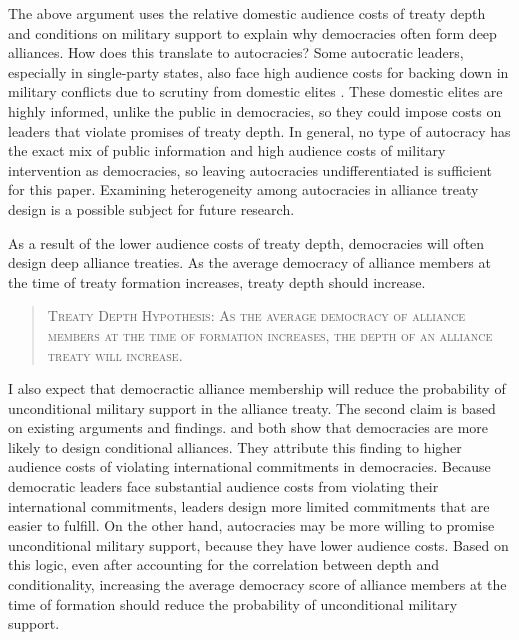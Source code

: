 \documentclass[12pt]{article}
\begin{document}
The above argument uses the relative domestic audience costs of treaty depth and conditions on military support to explain why democracies often form deep alliances. 
How does this translate to autocracies? 
Some autocratic leaders, especially in single-party states, also face high audience costs for backing down in military conflicts due to scrutiny from domestic elites \citep{Weeks2014}. 
These domestic elites are highly informed, unlike the public in democracies, so they could impose costs on leaders that violate promises of treaty depth. 
In general, no type of autocracy has the exact mix of public information and high audience costs of military intervention as democracies, so leaving autocracies undifferentiated is sufficient for this paper. 
Examining heterogeneity among autocracies in alliance treaty design is a possible subject for future research. 


As a result of the lower audience costs of treaty depth, democracies will often design deep alliance treaties. 
As the average democracy of alliance members at the time of treaty formation increases, treaty depth should increase. 


\begin{quote}
\textsc{Treaty Depth Hypothesis: As the average democracy of alliance members at the time of formation increases, the depth of an alliance treaty will increase.}
\end{quote} 


I also expect that democractic alliance membership will reduce the probability of unconditional military support in the alliance treaty. 
The second claim is based on existing arguments and findings. 
\citet{Mattes2012} and \citet{Chibaetal2015} both show that democracies are more likely to design conditional alliances. 
They attribute this finding to higher audience costs of violating international commitments in democracies. 
Because democratic leaders face substantial audience costs from violating their international commitments, leaders design more limited commitments that are easier to fulfill. 
On the other hand, autocracies may be more willing to promise unconditional military support, because they have lower audience costs. 
Based on this logic, even after accounting for the correlation between depth and conditionality, increasing the average democracy score of alliance members at the time of formation should reduce the probability of unconditional military support.
\end{document}
